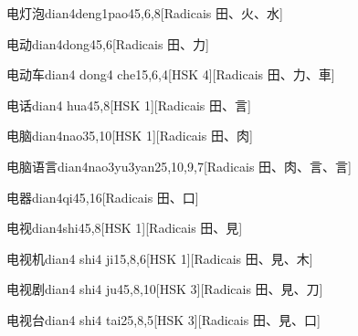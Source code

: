 \begin{entry}{电灯泡}{dian4deng1pao4}{5,6,8}[Radicais ⽥、⽕、⽔]
\end{entry}

\begin{entry}{电动}{dian4dong4}{5,6}[Radicais ⽥、⼒]
\end{entry}

\begin{entry}{电动车}{dian4 dong4 che1}{5,6,4}[HSK 4][Radicais ⽥、⼒、⾞]
\end{entry}

\begin{entry}{电话}{dian4 hua4}{5,8}[HSK 1][Radicais ⽥、⾔]
\end{entry}

\begin{entry}{电脑}{dian4nao3}{5,10}[HSK 1][Radicais ⽥、⾁]
\end{entry}

\begin{entry}{电脑语言}{dian4nao3yu3yan2}{5,10,9,7}[Radicais ⽥、⾁、⾔、⾔]
\end{entry}

\begin{entry}{电器}{dian4qi4}{5,16}[Radicais ⽥、⼝]
\end{entry}

\begin{entry}{电视}{dian4shi4}{5,8}[HSK 1][Radicais ⽥、⾒]
\end{entry}

\begin{entry}{电视机}{dian4 shi4 ji1}{5,8,6}[HSK 1][Radicais ⽥、⾒、⽊]
\end{entry}

\begin{entry}{电视剧}{dian4 shi4 ju4}{5,8,10}[HSK 3][Radicais ⽥、⾒、⼑]
\end{entry}

\begin{entry}{电视台}{dian4 shi4 tai2}{5,8,5}[HSK 3][Radicais ⽥、⾒、⼝]
\end{entry}

